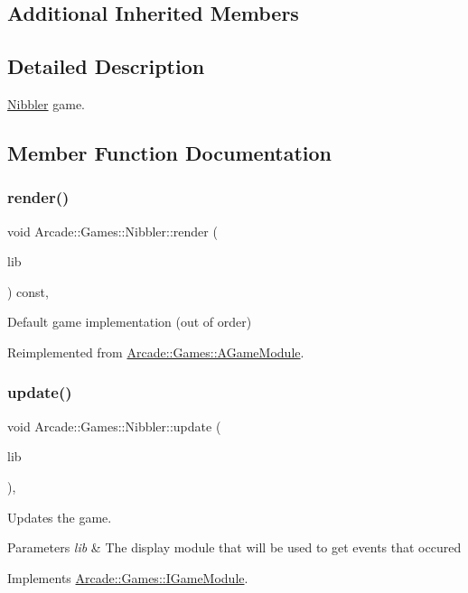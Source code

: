\subsection*{Additional Inherited Members}


\subsection{Detailed Description}
\mbox{\hyperlink{classArcade_1_1Games_1_1Nibbler}{Nibbler}} game. 

\subsection{Member Function Documentation}
\mbox{\label{classArcade_1_1Games_1_1Nibbler_afd52ee2fad66523b58f94f9eb582145e}} 
\subsubsection{\texorpdfstring{render()}{render()}}
{\footnotesize\ttfamily void Arcade\+::\+Games\+::\+Nibbler\+::render (\begin{DoxyParamCaption}\item[{\mbox{\hyperlink{classArcade_1_1Display_1_1IDisplayModule}{Arcade\+::\+Display\+::\+I\+Display\+Module}} \&}]{lib }\end{DoxyParamCaption}) const\hspace{0.3cm}{\ttfamily [final]}, {\ttfamily [virtual]}}

Default game implementation (out of order) 

Reimplemented from \mbox{\hyperlink{classArcade_1_1Games_1_1AGameModule_a5897780d42d5faba3287c29b87f2b498}{Arcade\+::\+Games\+::\+A\+Game\+Module}}.

\mbox{\label{classArcade_1_1Games_1_1Nibbler_a6a44a75ab1905647587d7a6314155955}} 
\subsubsection{\texorpdfstring{update()}{update()}}
{\footnotesize\ttfamily void Arcade\+::\+Games\+::\+Nibbler\+::update (\begin{DoxyParamCaption}\item[{const \mbox{\hyperlink{classArcade_1_1Display_1_1IDisplayModule}{Arcade\+::\+Display\+::\+I\+Display\+Module}} \&}]{lib }\end{DoxyParamCaption})\hspace{0.3cm}{\ttfamily [final]}, {\ttfamily [virtual]}}



Updates the game. 


\begin{DoxyParams}{Parameters}
{\em lib} & The display module that will be used to get events that occured \\
\hline
\end{DoxyParams}


Implements \mbox{\hyperlink{classArcade_1_1Games_1_1IGameModule_a421d1064fcc112dfc7ea025fc7f88aa7}{Arcade\+::\+Games\+::\+I\+Game\+Module}}.

